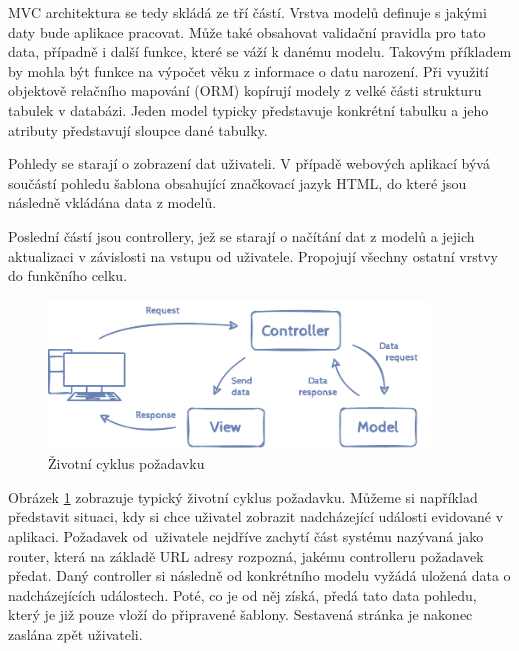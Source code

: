 MVC architektura se tedy skládá ze tří částí. Vrstva modelů definuje s jakými daty bude aplikace pracovat. Může také obsahovat validační pravidla pro tato data, případně i další funkce, které se váží k danému modelu. Takovým příkladem by mohla být funkce na výpočet věku z informace o datu narození. Při využití objektově relačního mapování (ORM) kopírují modely z velké části strukturu tabulek v databázi. Jeden model typicky představuje konkrétní tabulku a jeho atributy představují sloupce dané tabulky.

Pohledy se starají o zobrazení dat uživateli. V případě webových aplikací bývá součástí pohledu šablona obsahující značkovací jazyk HTML, do které jsou následně vkládána data z modelů.

Poslední částí jsou controllery, jež se starají o načítání dat z modelů a jejich aktualizaci v závislosti na vstupu od uživatele. Propojují všechny ostatní vrstvy do funkčního celku.

\begin{figure}[h]
	\caption{Životní cyklus požadavku}
	\label{figure:mvc}
	\centering
	\includegraphics[width=0.9\textwidth]{images/mvc.pdf}
\end{figure}

Obrázek \ref{figure:mvc} zobrazuje typický životní cyklus požadavku. Můžeme si například představit situaci, kdy si chce uživatel zobrazit nadcházející události evidované v aplikaci. Požadavek od~uživatele nejdříve zachytí část systému nazývaná jako router, která na základě URL adresy rozpozná, jakému controlleru požadavek předat. Daný controller si následně od konkrétního modelu vyžádá uložená data o nadcházejících událostech. Poté, co je od něj získá, předá tato data pohledu, který je již pouze vloží do připravené šablony. Sestavená stránka je nakonec zaslána zpět uživateli.
